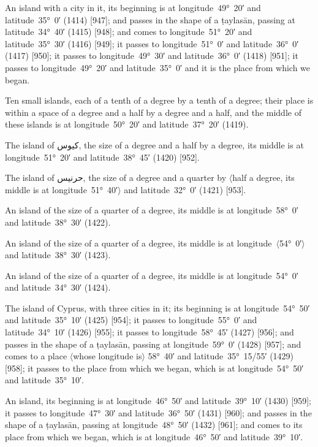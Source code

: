 \documentclass[11pt]{article}
\newcommand{\Pg}[1]{\marginpar{\footnotesize #1}}
\newcommand{\Ang}[1]{\ensuremath{#1}}
\begin{document}
An island with a city in it, its beginning is at longitude~49°~20′ and latitude~35°~0′ (1414) [947]; and passes in the shape of a ṭaylasān, passing at latitude~34°~40′ (1415) [948]; and comes to longitude~51°~20′ and latitude~35°~30′ (1416) [949]; it passes to longitude~51°~0′ and latitude~36°~0′ (1417) [950]; it passes to longitude~49°~30′ and latitude~36°~0′ (1418) [951]; it passes to longitude~49°~20′ and latitude~35°~0′ and it is the place from which we began.

Ten small islands, each of a tenth of a degree by a tenth of a degree; their place is within a space of a degree and a half by a degree and a half, and the middle of these islands is at longitude~50°~20′ and latitude~37°~20′ (1419).

The island of \textarabic{كيوس}, the size of a degree and a half by a degree, its middle is at longitude~51°~20′ and latitude~38°~45′ (1420) [952].

The island of \textarabic{حرنيس}, the size of a degree and a quarter by \Ang{\langle}half a degree, its middle is at longitude~51°~40′\Ang{\rangle} and latitude~32°~0′ (1421) [953].

An island of the size of a quarter of a degree, its middle is at longitude~58°~0′ and latitude~38°~30′ (1422).

An island of the size of a quarter of a degree, its middle is at longitude~\Ang{\langle}54°~0′\Ang{\rangle} and latitude~38°~30′ (1423).

An island of the size of a quarter of a degree, its middle is at longitude~54°~0′ and latitude~34°~30′ (1424).

\Pg{p. 93}The island of Cyprus, with three cities in it; its beginning is at longitude~54°~50′ and latitude~35°~10′ (1425) [954]; it passes to longitude~55°~0′ and latitude~34°~10′ (1426) [955]; it passes to longitude~58°~45′ (1427) [956]; and passes in the shape of a ṭaylasān, passing at longitude~59°~0′ (1428) [957]; and comes to a place \Ang{\langle}whose longitude is\Ang{\rangle} 58°~40′ and latitude~35°~15/55′ (1429) [958]; it passes to the place from which we began, which is at longitude~54°~50′ and latitude~35°~10′.

An island, its beginning is at longitude~46°~50′ and latitude~39°~10′ (1430) [959]; it passes to longitude~47°~30′ and latitude~36°~50′ (1431) [960]; and passes in the shape of a ṭaylasān, passing at longitude~48°~50′ (1432) [961]; and comes to its place from which we began, which is at longitude~46°~50′ and latitude~39°~10′.
\end{document}
